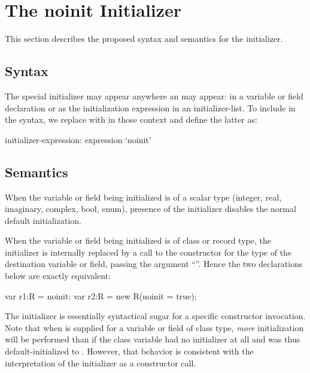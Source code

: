 
\section{The {\bf noinit} Initializer}
\label{noinit}

This section describes the proposed syntax and semantics for the 
initializer.

\subsection{Syntax}
\label{noinit_Syntax}

The special initializer  may appear anywhere an 
may appear: in a variable or field declaration or as the initialization expression in an
initializer-list.  To include  in the syntax, we replace 
with  in those context and define the latter as:
\begin{syntax}
initializer-expression:
  expression
  `noinit'
\end{syntax}

\subsection{Semantics}
\label{noinit_Semantics}

When the variable or field being initialized is of a scalar type (integer, real, imaginary,
complex, bool, enum), presence of the  initializer disables the normal
default initialization. 

When the variable or field being initialized is of class or record type, the 
initializer is internally replaced by a call to the constructor for the type of the
destination variable or field, passing the argument ``''.  Hence the
two declarations below are exactly equivalent: 
\begin{chapel}
var r1:R = noinit;
var r2:R = new R(noinit = true);
\end{chapel}
\noindent
The  initializer is essentially syntactical sugar for a specific constructor
invocation.  Note that when  is supplied for a variable or field of class
type, \emph{more} initialization will be performed than if the class variable had no
initializer at all and was thus default-initialized to .  However, that behavior
is consistent with the interpretation of the  initializer as a constructor call.

